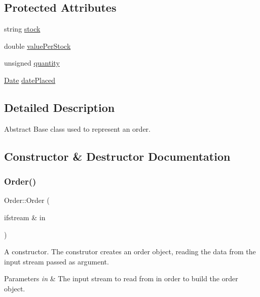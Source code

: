 \subsection*{Protected Attributes}
\begin{DoxyCompactItemize}
\item 
string \hyperlink{class_order_aafb6dfab2a1c253eefd78840b27dcd2e}{stock}
\item 
double \hyperlink{class_order_ab5d512fb35483413b9fe200d58324c2e}{value\+Per\+Stock}
\item 
unsigned \hyperlink{class_order_ab02e2baeb8c57217a20c9124df3ba11d}{quantity}
\item 
\hyperlink{class_date}{Date} \hyperlink{class_order_a23f58bb3f0162aac8c91a8a14136990c}{date\+Placed}
\end{DoxyCompactItemize}


\subsection{Detailed Description}
Abstract Base class used to represent an order. 

\subsection{Constructor \& Destructor Documentation}
\hypertarget{class_order_afd9bc0f1cf5ad376154ffde0e2727fbb}{}\label{class_order_afd9bc0f1cf5ad376154ffde0e2727fbb} 
\subsubsection{\texorpdfstring{Order()}{Order()}\hspace{0.1cm}{\footnotesize\ttfamily [1/2]}}
{\footnotesize\ttfamily Order\+::\+Order (\begin{DoxyParamCaption}\item[{ifstream \&}]{in }\end{DoxyParamCaption})}

A constructor. The construtor creates an order object, reading the data from the input stream passed as argument. 
\begin{DoxyParams}{Parameters}
{\em in} & The input stream to read from in order to build the order object. \\
\hline
\end{DoxyParams}
\hypertarget{class_order_afdda61d21957bffaf29e666ee6741bdc}{}\label{class_order_afdda61d21957bffaf29e666ee6741bdc} 
